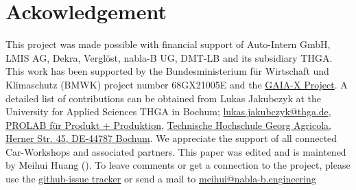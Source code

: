 \section{Ackowledgement}
This project was made possible with financial support of Auto-Intern GmbH, LMIS AG, Dekra, Verglöst, nabla-B UG, DMT-LB and its subsidiary THGA.
This work has been supported by the Bundesministerium für Wirtschaft und Klimaschutz (BMWK) project number 68GX21005E and the \href{https://gaia-x.eu/}{GAIA-X Project}.
A detailed list of contributions can be obtained from Lukas Jakubczyk at the University for Applied Sciences THGA in Bochum; \href{mailto:lukas.jakubczyk@thga.de}{lukas.jakubczyk@thga.de}, \href{https://www.thga.de/forschung/maschinenbau-und-materialwissenschaften/labore/prolab-produkt-produktion}{PROLAB für Produkt + Produktion}, \href{https://maps.app.goo.gl/tQA3Qfn5f6gGqMHg8}{Technische Hochschule Georg Agricola, Herner Str. 45, DE-44787 Bochum}.
We appreciate the support of all connected Car-Workshops and associated partners. 
This paper was edited and is maintened by Meihui Huang (). 
To leave comments or get a connection to the project, please use the \href{https://github.com/nabla-B/paper_aw4null-overview/issues}{github-issue tracker} or send a mail to \href{mailto:meihui@nabla-b.engineering}{meihui@nabla-b.engineering}





